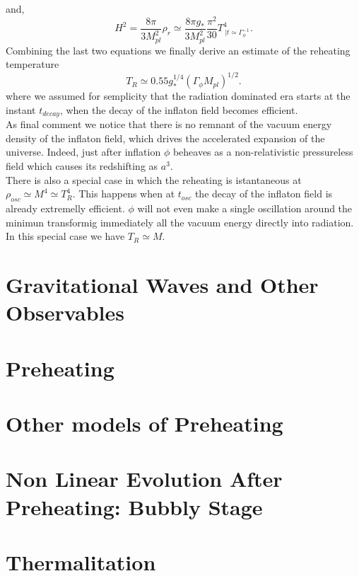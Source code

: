 \documentclass[11pt,a4paper,twoside]{book}
\begin{document}
and,
\begin{equation}
	H^{2}=\frac{8\pi }{3M_{pl}^{2}}\rho_{r}\simeq \frac{8 \pi g_{*}}{3M_{pl}^{2}}\frac{\pi^{2}}{30}T^{4}_{\ |t\simeq \Gamma_{\phi}^{-1}}.
\end{equation}
Combining the last two equations we finally derive an estimate of the reheating temperature
\begin{equation}
	\label{Chap2:reheatingTemperature}
	T_{R} \simeq 0.55g_{*}^{1/4}(\Gamma_{\phi}M_{pl})^{1/2}.
\end{equation}
where we assumed for semplicity that the radiation dominated era starts at the instant $ t_{decay} $, when the decay of the inflaton field becomes efficient.\\ 
As final comment we notice that there is no remnant of the vacuum energy density of the inflaton field, which drives the accelerated expansion of the universe. Indeed, just after inflation $\phi$ beheaves as a non-relativistic pressureless field which causes its redshifting as $ a^{3} $.\\
There is also a special case in which the reheating is istantaneous at $ \rho_{osc} \simeq M^{4} \simeq T^{4}_{R} $. This happens when at $ t_{osc} $ the decay of the inflaton field is already extremelly efficient. $\phi$ will not even make a single oscillation around the minimun transformig immediately all the vacuum energy directly into radiation. In this special case we have $ T_{R} \simeq M $.



\chapter{Gravitational Waves and Other Observables}

\chapter{Preheating}

\chapter{Other models of Preheating}

\chapter{Non Linear Evolution After Preheating: Bubbly Stage}

\chapter{Thermalitation}
\end{document}
